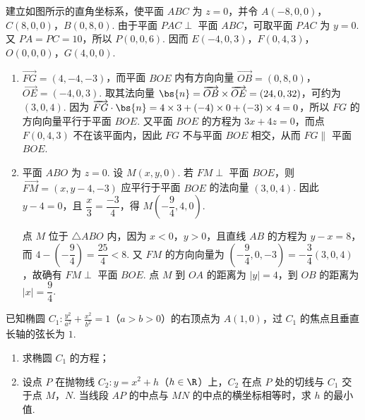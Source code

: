 \begin{solution}
建立如图所示的直角坐标系，使平面 \(ABC\) 为 \(z=0\)，并令
\(A(-8,0,0)\)，\(C(8,0,0)\)，\(B(0,8,0)\). 由于平面 \(PAC\perp\) 平面 \(ABC\)，可取平面 \(PAC\) 为 \(y=0\). 又 \(PA=PC=10\)，所以 \(P(0,0,6)\). 因而
\(E(-4,0,3)\)，\(F(0,4,3)\)，\(O(0,0,0)\)，\(G(4,0,0)\).

\begin{enumerate}
\item \(\overrightarrow{FG}=(4,-4,-3)\)，而平面 \(BOE\) 内有方向向量 \(\overrightarrow{OB}=(0,8,0)\)，\(\overrightarrow{OE}=(-4,0,3)\). 取其法向量
\(\bs{n}=\overrightarrow{OB}\times\overrightarrow{OE}=(24,0,32)\)，可约为 \((3,0,4)\). 因为 \(\overrightarrow{FG}\cdot\bs{n}=4\times3+(-4)\times0+(-3)\times4=0\)，所以 \(FG\) 的方向向量平行于平面 \(BOE\). 又平面 \(BOE\) 的方程为 \(3x+4z=0\)，而点 \(F(0,4,3)\) 不在该平面内，因此 \(FG\) 不与平面 \(BOE\) 相交，从而 \(FG\parallel\) 平面 \(BOE\).
\item 平面 \(ABO\) 为 \(z=0\). 设 \(M(x,y,0)\). 若 \(FM\perp\) 平面 \(BOE\)，则 \(\overrightarrow{FM}=(x,y-4,-3)\) 应平行于平面 \(BOE\) 的法向量 \((3,0,4)\). 因此 \(y-4=0\)，且 \(\dfrac{x}{3}=\dfrac{-3}{4}\)，得 \(M\left(-\dfrac94,4,0\right)\).

点 \(M\) 位于 \(\triangle ABO\) 内，因为 \(x<0\)，\(y>0\)，且直线 \(AB\) 的方程为 \(y-x=8\)，而 \(4-\left(-\dfrac94\right)=\dfrac{25}{4}<8\). 又 \(FM\) 的方向向量为 \(\left(-\dfrac94,0,-3\right)=-\dfrac34(3,0,4)\)，故确有 \(FM\perp\) 平面 \(BOE\). 点 \(M\) 到 \(OA\) 的距离为 \(|y|=4\)，到 \(OB\) 的距离为 \(|x|=\dfrac94\).
\end{enumerate}
\end{solution}

\begin{problem}
已知椭圆 \(C_1:\frac{y^2}{a^2}+\frac{x^2}{b^2}=1\)（\(a>b>0\)）的右顶点为 \(A(1,0)\)，过 \(C_1\) 的焦点且垂直长轴的弦长为 \(1\).
\begin{enumerate}
\item 求椭圆 \(C_1\) 的方程；
\item 设点 \(P\) 在抛物线 \(C_2:y=x^2+h\)（\(h\in\R\)）上，\(C_2\) 在点 \(P\) 处的切线与 \(C_1\) 交于点 \(M\)，\(N\). 当线段 \(AP\) 的中点与 \(MN\) 的中点的横坐标相等时，求 \(h\) 的最小值.
\end{enumerate}
\end{problem}

